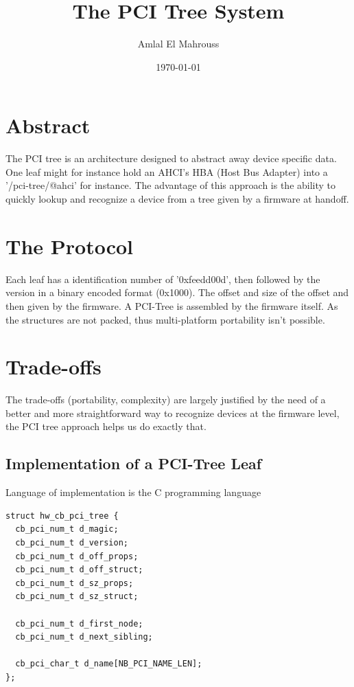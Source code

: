 \documentclass{article}
\title{The PCI Tree System}
\author{Amlal El Mahrouss}
\date{\today}
\begin{document}
\maketitle

\section{Abstract}

The PCI tree is an architecture designed to abstract away device specific data. One leaf might for instance hold an AHCI's HBA (Host Bus Adapter) into a '/pci-tree/@ahci' for instance. The advantage of this approach is the ability to quickly lookup and recognize a device from a tree given by a firmware at handoff.

\section{The Protocol}

Each leaf has a identification number of '0xfeedd00d', then followed by the version in a binary encoded format (0x1000). The offset and size of the offset and then given by the firmware. A PCI-Tree is assembled by the firmware itself. As the structures are not packed, thus multi-platform portability isn't possible.

\section{Trade-offs}

The trade-offs (portability, complexity) are largely justified by the need of a better and more straightforward way to recognize devices at the firmware level, the PCI tree approach helps us do exactly that.

\subsection{Implementation of a PCI-Tree Leaf}

Language of implementation is the C programming language

\begin{lstlisting}
struct hw_cb_pci_tree {
  cb_pci_num_t d_magic;
  cb_pci_num_t d_version;
  cb_pci_num_t d_off_props;
  cb_pci_num_t d_off_struct;
  cb_pci_num_t d_sz_props;
  cb_pci_num_t d_sz_struct;

  cb_pci_num_t d_first_node;
  cb_pci_num_t d_next_sibling;

  cb_pci_char_t d_name[NB_PCI_NAME_LEN];
};

\end{lstlisting}
\end{document}
